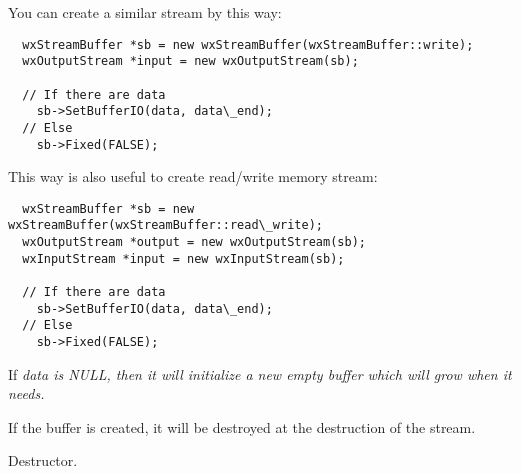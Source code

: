 

You can create a similar stream by this way:

\begin{verbatim}
  wxStreamBuffer *sb = new wxStreamBuffer(wxStreamBuffer::write);
  wxOutputStream *input = new wxOutputStream(sb);

  // If there are data
    sb->SetBufferIO(data, data\_end);
  // Else
    sb->Fixed(FALSE);
\end{verbatim}

This way is also useful to create read/write memory stream:

\begin{verbatim}
  wxStreamBuffer *sb = new wxStreamBuffer(wxStreamBuffer::read\_write);
  wxOutputStream *output = new wxOutputStream(sb);
  wxInputStream *input = new wxInputStream(sb);

  // If there are data
    sb->SetBufferIO(data, data\_end);
  // Else
    sb->Fixed(FALSE);
\end{verbatim}




If \it{data} is NULL, then it will initialize a new empty buffer which will
grow when it needs.


If the buffer is created, it will be destroyed at the destruction of the
stream.



Destructor.

